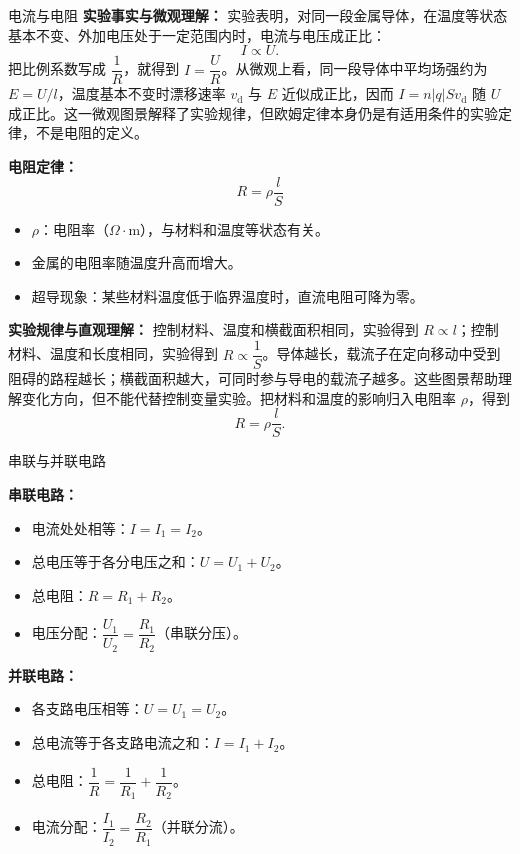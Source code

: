 \begin{conceptbox}{电流与电阻}
\textbf{实验事实与微观理解：} 实验表明，对同一段金属导体，在温度等状态基本不变、外加电压处于一定范围内时，电流与电压成正比：
\[
I\propto U.
\]
把比例系数写成 $\dfrac{1}{R}$，就得到 $I=\dfrac{U}{R}$。从微观上看，同一段导体中平均场强约为 $E=U/l$，温度基本不变时漂移速率 $v_{\mathrm d}$ 与 $E$ 近似成正比，因而 $I=n\lvert q\rvert Sv_{\mathrm d}$ 随 $U$ 成正比。这一微观图景解释了实验规律，但欧姆定律本身仍是有适用条件的实验定律，不是电阻的定义。

\textbf{电阻定律：}
\[
\boxed{R = \rho \frac{l}{S}}
\]

\begin{itemize}
  \item $\rho$：电阻率（$\Omega \cdot \mathrm{m}$），与材料和温度等状态有关。
  \item 金属的电阻率随温度升高而增大。
  \item 超导现象：某些材料温度低于临界温度时，直流电阻可降为零。
\end{itemize}

\textbf{实验规律与直观理解：} 控制材料、温度和横截面积相同，实验得到 $R\propto l$；控制材料、温度和长度相同，实验得到 $R\propto \dfrac{1}{S}$。导体越长，载流子在定向移动中受到阻碍的路程越长；横截面积越大，可同时参与导电的载流子越多。这些图景帮助理解变化方向，但不能代替控制变量实验。把材料和温度的影响归入电阻率 $\rho$，得到
\[
R=\rho\frac{l}{S}.
\]

\end{conceptbox}

\begin{conceptbox}{串联与并联电路}

\begin{center}


\label{fig:series-parallel}
\end{center}

\textbf{串联电路：}
\begin{itemize}
  \item 电流处处相等：$I = I_1 = I_2$。
  \item 总电压等于各分电压之和：$U = U_1 + U_2$。
  \item 总电阻：$R = R_1 + R_2$。
  \item 电压分配：$\dfrac{U_1}{U_2} = \dfrac{R_1}{R_2}$（串联分压）。
\end{itemize}

\textbf{并联电路：}
\begin{itemize}
  \item 各支路电压相等：$U = U_1 = U_2$。
  \item 总电流等于各支路电流之和：$I = I_1 + I_2$。
  \item 总电阻：$\dfrac{1}{R} = \dfrac{1}{R_1} + \dfrac{1}{R_2}$。
  \item 电流分配：$\dfrac{I_1}{I_2} = \dfrac{R_2}{R_1}$（并联分流）。
\end{itemize}

\end{conceptbox}

